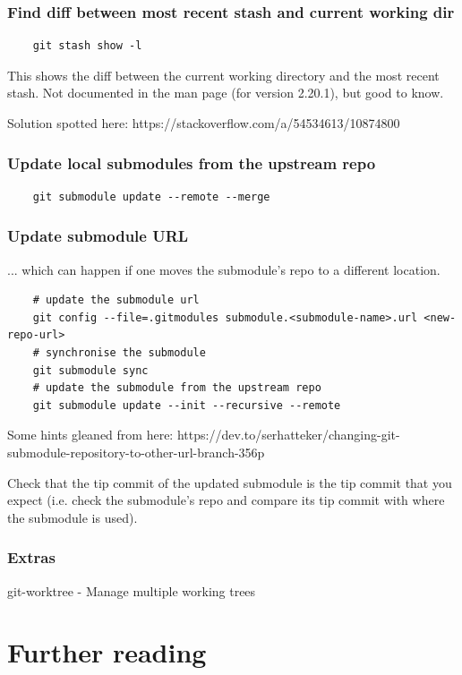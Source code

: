 \documentclass{git_course}
\begin{document}
\begin{frame}[fragile]
    \frametitle{Find diff between most recent stash and current working dir}
    \begin{lstlisting}
    git stash show -l
    \end{lstlisting}

    This shows the diff between the current working directory and the most
    recent stash. Not documented in the  man page (for version
    2.20.1), but good to know.

    Solution spotted here: https://stackoverflow.com/a/54534613/10874800
\end{frame}

\begin{frame}[fragile]
    \frametitle{Update local submodules from the upstream repo}

    \begin{lstlisting}
    git submodule update --remote --merge
    \end{lstlisting}
\end{frame}

\begin{frame}[fragile]
    \frametitle{Update submodule URL}

    ... which can happen if one moves the submodule's repo to a different
    location.

    \begin{lstlisting}
    # update the submodule url
    git config --file=.gitmodules submodule.<submodule-name>.url <new-repo-url>
    # synchronise the submodule
    git submodule sync
    # update the submodule from the upstream repo
    git submodule update --init --recursive --remote
    \end{lstlisting}

    Some hints gleaned from here:
    https://dev.to/serhatteker/changing-git-submodule-repository-to-other-url-branch-356p

    Check that the tip commit of the updated submodule is the tip commit
    that you expect (i.e. check the submodule's repo and compare its tip
    commit with where the submodule is used).
\end{frame}

\begin{frame}
\frametitle{Extras}
git-worktree - Manage multiple working trees
\end{frame}

\section{Further reading}
\end{document}
